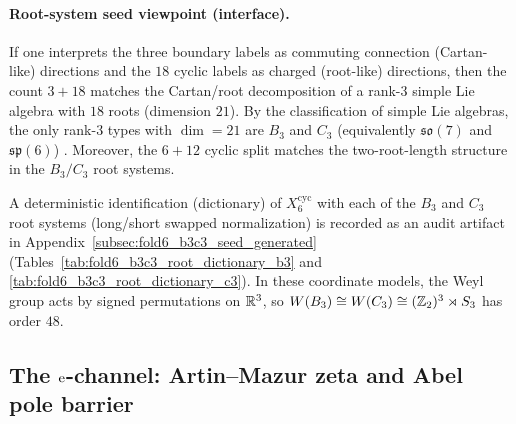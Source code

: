 \paragraph{Root-system seed viewpoint (interface).}
\InterfaceTag If one interprets the three boundary labels as commuting connection (Cartan-like) directions and the $18$ cyclic labels as charged (root-like) directions, then the count $3+18$ matches the Cartan/root decomposition of a rank-$3$ simple Lie algebra with $18$ roots (dimension $21$).
By the classification of simple Lie algebras, the only rank-$3$ types with $\dim=21$ are $B_3$ and $C_3$ (equivalently $\mathfrak{so}(7)$ and $\mathfrak{sp}(6)$) \cite{HallLieGroups2015,FultonHarris1991RepresentationTheory}.
Moreover, the $6+12$ cyclic split matches the two-root-length structure in the $B_3/C_3$ root systems.
\par
\InterfaceTag A deterministic identification (dictionary) of $X_6^{\mathrm{cyc}}$ with each of the $B_3$ and $C_3$ root systems (long/short swapped normalization) is recorded as an audit artifact in Appendix~\ref{subsec:fold6_b3c3_seed_generated} (Tables~\ref{tab:fold6_b3c3_root_dictionary_b3} and \ref{tab:fold6_b3c3_root_dictionary_c3}).
In these coordinate models, the Weyl group acts by signed permutations on $\mathbb{R}^3$, so $W(B_3)\cong W(C_3)\cong (\mathbb{Z}_2)^3\rtimes S_3$ has order $48$.

\subsection{The \texorpdfstring{$\mathrm{e}$}{e}-channel: Artin--Mazur zeta and Abel pole barrier}
\label{subsec:e_channel}


